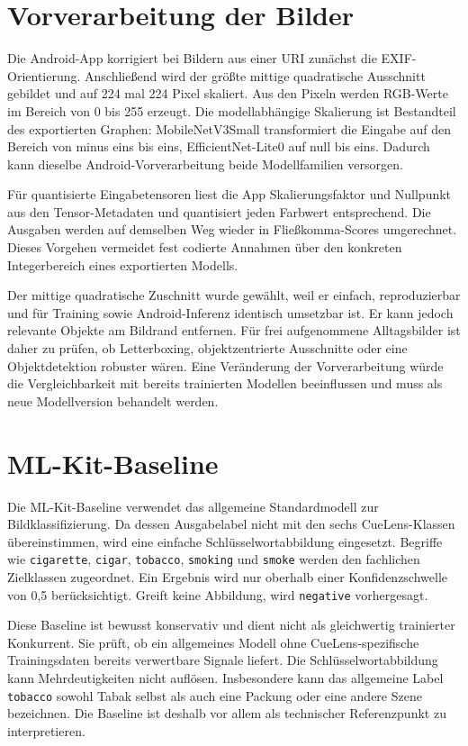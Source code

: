 \section{Vorverarbeitung der Bilder}
Die Android-App korrigiert bei Bildern aus einer URI zunächst die EXIF-Orientierung. Anschließend wird der größte mittige quadratische Ausschnitt gebildet und auf 224 mal 224 Pixel skaliert. Aus den Pixeln werden RGB-Werte im Bereich von 0 bis 255 erzeugt. Die modellabhängige Skalierung ist Bestandteil des exportierten Graphen: MobileNetV3Small transformiert die Eingabe auf den Bereich von minus eins bis eins, EfficientNet-Lite0 auf null bis eins. Dadurch kann dieselbe Android-Vorverarbeitung beide Modellfamilien versorgen.

Für quantisierte Eingabetensoren liest die App Skalierungsfaktor und Nullpunkt aus den Tensor-Metadaten und quantisiert jeden Farbwert entsprechend. Die Ausgaben werden auf demselben Weg wieder in Fließkomma-Scores umgerechnet. Dieses Vorgehen vermeidet fest codierte Annahmen über den konkreten Integerbereich eines exportierten Modells.

Der mittige quadratische Zuschnitt wurde gewählt, weil er einfach, reproduzierbar und für Training sowie Android-Inferenz identisch umsetzbar ist. Er kann jedoch relevante Objekte am Bildrand entfernen. Für frei aufgenommene Alltagsbilder ist daher zu prüfen, ob Letterboxing, objektzentrierte Ausschnitte oder eine Objektdetektion robuster wären. Eine Veränderung der Vorverarbeitung würde die Vergleichbarkeit mit bereits trainierten Modellen beeinflussen und muss als neue Modellversion behandelt werden.

\section{ML-Kit-Baseline}

Die ML-Kit-Baseline verwendet das allgemeine Standardmodell zur Bildklassifizierung. Da dessen Ausgabelabel nicht mit den sechs CueLens-Klassen übereinstimmen, wird eine einfache Schlüsselwortabbildung eingesetzt. Begriffe wie \texttt{cigarette}, \texttt{cigar}, \texttt{tobacco}, \texttt{smoking} und \texttt{smoke} werden den fachlichen Zielklassen zugeordnet. Ein Ergebnis wird nur oberhalb einer Konfidenzschwelle von 0,5 berücksichtigt. Greift keine Abbildung, wird \texttt{negative} vorhergesagt.

Diese Baseline ist bewusst konservativ und dient nicht als gleichwertig trainierter Konkurrent. Sie prüft, ob ein allgemeines Modell ohne CueLens-spezifische Trainingsdaten bereits verwertbare Signale liefert. Die Schlüsselwortabbildung kann Mehrdeutigkeiten nicht auflösen. Insbesondere kann das allgemeine Label \texttt{tobacco} sowohl Tabak selbst als auch eine Packung oder eine andere Szene bezeichnen. Die Baseline ist deshalb vor allem als technischer Referenzpunkt zu interpretieren.

